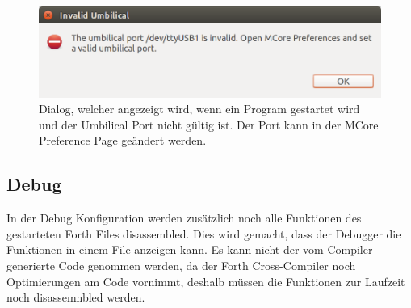 \begin{figure}[H]
	\centering
		\includegraphics[scale=0.4]{launch/invalidumbilical.png}
		\caption{Dialog, welcher angezeigt wird, wenn ein Program gestartet wird und der Umbilical Port nicht gültig ist. Der Port kann in der MCore Preference Page geändert werden.}
		\label{fig:extensionpoint}
\end{figure}

\subsection{Debug}

In der Debug Konfiguration werden zusätzlich noch alle Funktionen des gestarteten Forth Files disassembled. Dies wird gemacht, dass der Debugger die Funktionen in einem File anzeigen kann. Es kann nicht der vom Compiler generierte Code genommen werden, da der Forth Cross-Compiler noch Optimierungen am Code vornimmt, deshalb müssen die Funktionen zur Laufzeit noch disassemnbled werden.

